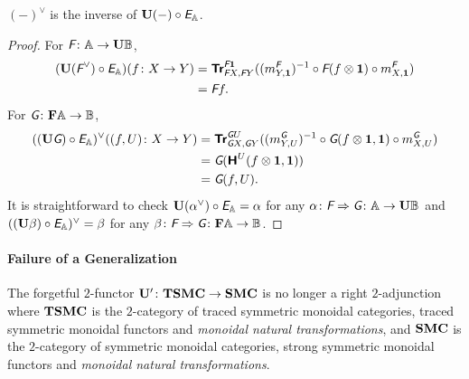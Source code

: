 \begin{proposition}
  \((-)^{\vee}\) is the inverse of \(\mathbf{U}(-) \circ \textit{\textsf{E}}_{\mathbb{A}}\).
\end{proposition}
\begin{proof}
  For \(\textit{\textsf{F}} \colon \mathbb{A} \to \mathbf{U}\mathbb{B}\),
  \begin{align*}
    (\mathbf{U} (\textit{\textsf{F}}^{\vee}) \circ \textit{\textsf{E}}_{\mathbb{A}})(f \colon X \to Y)
    &= {\normalfont\textsf{\textbf{Tr}}}^{\textit{\textsf{F}}\mathbf 1}_{\textit{\textsf{F}}X,\textit{\textsf{F}}Y} ((m^{\textit{\textsf{F}}}_{Y,\mathbf 1})^{-1} \circ
    \textit{\textsf{F}}(f \otimes \mathbf 1) \circ m^{\textit{\textsf{F}}}_{X,\mathbf 1}) \\
    &= \textit{\textsf{F}}f.
  \end{align*}
  For \(\textit{\textsf{G}} \colon \mathbf{F}\mathbb{A} \to \mathbb{B}\),
  \begin{align*}
    ((\mathbf{U} \textit{\textsf{G}}) \circ \textit{\textsf{E}}_{\mathbb{A}})^{\vee}((f,U) \colon X \to Y)
    &= {\normalfont\textsf{\textbf{Tr}}}^{\textit{\textsf{G}}U}_{\textit{\textsf{G}}X,\textit{\textsf{G}}Y}((m^{\textit{\textsf{G}}}_{Y,U})^{-1}
    \circ \textit{\textsf{G}}(f \otimes \mathbf 1,\mathbf 1) \circ m^{\textit{\textsf{G}}}_{X,U}) \\
    &= \textit{\textsf{G}}({\normalfont\textsf{\textbf{H}}^{U}}(f \otimes \mathbf 1,\mathbf 1)) \\
    &= \textit{\textsf{G}}(f,U).
  \end{align*}
  It is straightforward to check
  \(\mathbf{U} (\alpha^{\vee}) \circ \textit{\textsf{E}}_{\mathbb{A}} = \alpha\) for any \(\alpha
  \colon \textit{\textsf{F}} \Rightarrow \textit{\textsf{G}} \colon \mathbb{A} \to
  \mathbf{U}\mathbb{B}\) and \(((\mathbf{U} \beta) \circ \textit{\textsf{E}}_{\mathbb{A}})^{\vee} = \beta\) for
  any \(\beta \colon \textit{\textsf{F}} \Rightarrow \textit{\textsf{G}} \colon \mathbf{F}\mathbb{A} \to \mathbb{B}\).
\end{proof}

\paragraph{Failure of a Generalization}

The forgetful \(2\)-functor \(\mathbf{U}' \colon \mathbf{TSMC} \to \mathbf{SMC}\) is no longer
a right \(2\)-adjunction where \(\mathbf{TSMC}\) is the \(2\)-category of traced
symmetric monoidal categories, traced symmetric monoidal functors and
\emph{monoidal natural transformations}, and \(\mathbf{SMC}\) is the
\(2\)-category of symmetric monoidal categories, strong symmetric
monoidal functors and \emph{monoidal natural transformations}.

